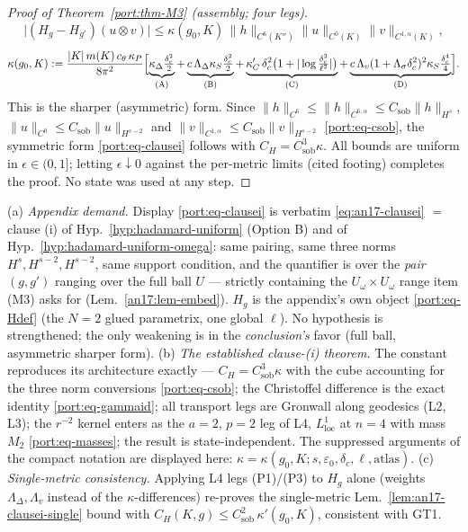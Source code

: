 \begin{proof}[Proof of Theorem~\ref{port:thm-M3} (assembly; four legs)]
\begin{equation}\label{port:eq-kappa}
  \bigl|(H_g-H_{g'})(u\otimes v)\bigr|
  \le\kappa(g_0,K)\,\|h\|_{C^6(K'')}\|u\|_{C^0(K)}\|v\|_{C^{1,\alpha}(K)},
\end{equation}
\[
  \kappa(g_0,K):=\frac{|K|\,m(K)\,c_\theta\,\kappa_P}{8\pi^2}
  \Bigl[\underbrace{\kappa_\Delta\tfrac{\delta_c^2}{2}}_{\mathrm{(A)}}
  +\underbrace{c\,\Lambda_\Delta\kappa_S\tfrac{\delta_c^2}{2}}
  _{\mathrm{(B)}}
  +\underbrace{\kappa_C'\,\delta_c^{2}
  \bigl(1+|\log\tfrac{\delta_c^2}{\ell^2}|\bigr)}_{\mathrm{(C)}}
  +\underbrace{c\,\Lambda_v(1+\Lambda_\sigma\delta_c^2)^2\kappa_S
  \tfrac{\delta_c^{4}}{4}}_{\mathrm{(D)}}\Bigr].
\]
This is the sharper (asymmetric) form. Since
$\|h\|_{C^6}\le\|h\|_{C^{6,\alpha}}\le C_{\mathrm{sob}}\|h\|_{H^s}$,
$\|u\|_{C^0}\le C_{\mathrm{sob}}\|u\|_{H^{s-2}}$ and
$\|v\|_{C^{1,\alpha}}\le C_{\mathrm{sob}}\|v\|_{H^{s-2}}$
\eqref{port:eq-csob}, the symmetric form \eqref{port:eq-clausei}
follows with $C_H=C_{\mathrm{sob}}^3\kappa$. All bounds are uniform in
$\epsilon\in(0,1]$; letting $\epsilon\downarrow0$ against the
per-metric limits (cited footing) completes the proof. No state was
used at any step. \qedhere
\end{proof}

\begin{remark}\label{port:rem-match}
(a) \emph{Appendix demand.} Display \eqref{port:eq-clausei} is verbatim
\eqref{eq:an17-clausei} $=$ clause (i) of Hyp.~\ref{hyp:hadamard-uniform} (Option B)
and of Hyp.~\ref{hyp:hadamard-uniform-omega}: same pairing, same three norms
$H^s,H^{s-2},H^{s-2}$, same support condition, and the quantifier is
over the \emph{pair} $(g,g')$ ranging over the full ball $U$ ---
strictly containing the $U_\omega\times U_\omega$ range item
(M3) asks for (Lem.~\ref{an17:lem-embed}). $H_g$ is the appendix's own object
\eqref{port:eq-Hdef} (the $N{=}2$ glued parametrix, one global $\ell$).
No hypothesis is strengthened; the only weakening is in the
\emph{conclusion's} favor (full ball, asymmetric sharper form).
(b) \emph{The established clause-(i) theorem.}
The constant reproduces its architecture exactly ---
$C_H=C_{\mathrm{sob}}^3\kappa$ with the cube accounting for the three
norm conversions \eqref{port:eq-csob}; the Christoffel difference is
the exact identity \eqref{port:eq-gammaid}; all transport legs are
Gronwall along geodesics (L2, L3); the $r^{-2}$ kernel enters as the
$a{=}2$, $p{=}2$ leg of L4, $L^1_{\mathrm{loc}}$ at $n=4$ with mass
$M_2$ \eqref{port:eq-masses}; the result is state-independent. The
suppressed arguments of the compact notation are displayed here:
$\kappa=\kappa(g_0,K;s,\varepsilon_0,\delta_c,\ell,\text{atlas})$.
(c) \emph{Single-metric consistency.} Applying L4 legs (P1)/(P3) to
$H_g$ alone (weights $\Lambda_\Delta,\Lambda_v$ instead of the
$\kappa$-differences) re-proves the single-metric
Lem.~\ref{lem:an17-clausei-single} bound with $C_H(K,g)\le
C_{\mathrm{sob}}^2\,\kappa'(g_0,K)$, consistent with GT1.
\end{remark}

